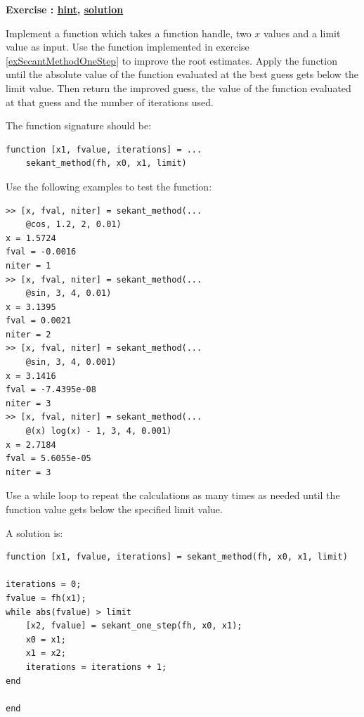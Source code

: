 \documentclass[12pt,a4paper]{article}
\makeatletter
\newcommand{\linkdest}[1]{\Hy@raisedlink{\hypertarget{#1}{}}}
\newcounter{ex}
\numberwithin{ex}{section}
\newenvironment{ex}[1][]{%
\filbreak
\bigskip
\refstepcounter{ex}
\noindent
\textbf{\linkdest{\theex{}exercise}{}Exercise \theex{}: #1\hfill\hyperlink{\theex{}hint}{hint}, \hyperlink{\theex{}solution}{solution}}\par\noindent}{}
\makeatother
\begin{document}
\begin{ex}
Implement a function which takes a function handle, two $x$ 
values and a limit value as input.
Use the function implemented in exercise
\ref{exSecantMethodOneStep} to improve the root estimates.
Apply the function until the absolute value of the function 
evaluated at the best guess gets below the limit value.
Then return the improved guess, the value of the function 
evaluated at that guess and the number of
iterations used.

The function signature should be:
\begin{lstlisting}
function [x1, fvalue, iterations] = ...
    sekant_method(fh, x0, x1, limit)
\end{lstlisting}
Use the following examples to test the function:
\begin{lstlisting}
>> [x, fval, niter] = sekant_method(...
    @cos, 1.2, 2, 0.01)
x = 1.5724
fval = -0.0016
niter = 1
>> [x, fval, niter] = sekant_method(...
    @sin, 3, 4, 0.01)
x = 3.1395
fval = 0.0021
niter = 2
>> [x, fval, niter] = sekant_method(...
    @sin, 3, 4, 0.001)
x = 3.1416
fval = -7.4395e-08
niter = 3
>> [x, fval, niter] = sekant_method(...
    @(x) log(x) - 1, 3, 4, 0.001)
x = 2.7184
fval = 5.6055e-05
niter = 3
\end{lstlisting}
\begin{hint}
Use a while loop to repeat the calculations as many times 
as needed until the function value gets below the 
specified limit value.
\end{hint}
\begin{sol}
A solution is:
\begin{lstlisting}
function [x1, fvalue, iterations] = sekant_method(fh, x0, x1, limit)

iterations = 0;
fvalue = fh(x1);
while abs(fvalue) > limit
    [x2, fvalue] = sekant_one_step(fh, x0, x1);
    x0 = x1;
    x1 = x2;
    iterations = iterations + 1;
end

end
\end{lstlisting}
\end{sol}
\end{ex}
\end{document}
